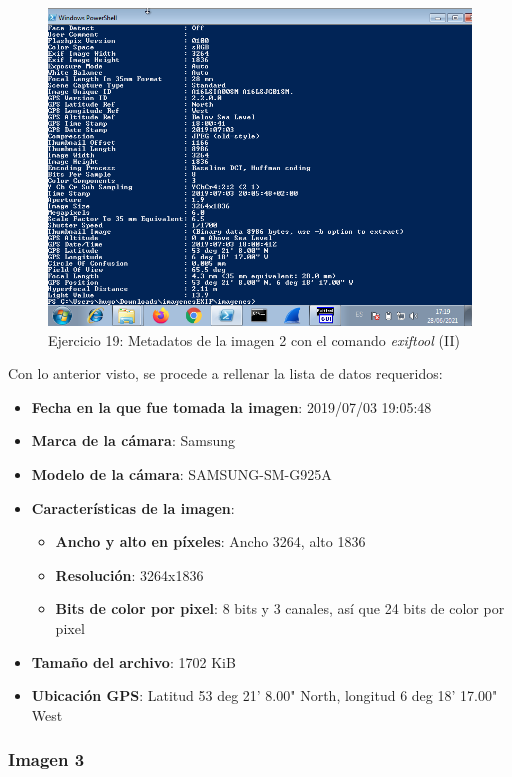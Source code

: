 \documentclass[11pt]{article}
\begin{document}
\begin{figure}[H]
    \caption{Ejercicio 19: Metadatos de la imagen 2 con el comando \textit{exiftool} (II)}
    \centering
    \includegraphics[scale=0.7]{p03/e19-6.png}
\end{figure}

Con lo anterior visto, se procede a rellenar la lista de datos requeridos:

\begin{itemize}
    \item \textbf{Fecha en la que fue tomada la imagen}: 2019/07/03 19:05:48 
    \item \textbf{Marca de la cámara}: Samsung
    \item \textbf{Modelo de la cámara}: SAMSUNG-SM-G925A
    \item \textbf{Características de la imagen}:
        \begin{itemize}
            \item \textbf{Ancho y alto en píxeles}: Ancho 3264, alto 1836
            \item \textbf{Resolución}: 3264x1836
            \item \textbf{Bits de color por pixel}: 8 bits y 3 canales, así que 24 bits de color por pixel
        \end{itemize}
    \item \textbf{Tamaño del archivo}: 1702 KiB
    \item \textbf{Ubicación GPS}: Latitud 53 deg 21' 8.00" North, longitud 6 deg 18' 17.00" West
\end{itemize}

\subsubsection{Imagen 3}
\end{document}
